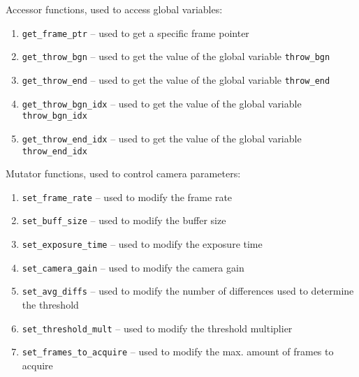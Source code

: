 Accessor functions, used to access global variables:

\begin{enumerate}
  \item \texttt{get\_frame\_ptr} -- used to get a specific frame pointer
  \item \texttt{get\_throw\_bgn} -- used to get the value of the global variable \texttt{throw\_bgn}
  \item \texttt{get\_throw\_end} -- used to get the value of the global variable \texttt{throw\_end}
  \item \texttt{get\_throw\_bgn\_idx} -- used to get the value of the global variable \texttt{throw\_bgn\_idx}
  \item \texttt{get\_throw\_end\_idx} -- used to get the value of the global variable \texttt{throw\_end\_idx}
\end{enumerate}

Mutator functions, used to control camera parameters:

\begin{enumerate}
  \item \texttt{set\_frame\_rate} -- used to modify the frame rate
  \item \texttt{set\_buff\_size} -- used to modify the buffer size
  \item \texttt{set\_exposure\_time} -- used to modify the exposure time
  \item \texttt{set\_camera\_gain} -- used to modify the camera gain
  \item \texttt{set\_avg\_diffs} -- used to modify the number of differences used to determine the threshold
  \item \texttt{set\_threshold\_mult} -- used to modify the threshold multiplier
  \item \texttt{set\_frames\_to\_acquire} -- used to modify the max. amount of frames to acquire
\end{enumerate}

\clearpage

